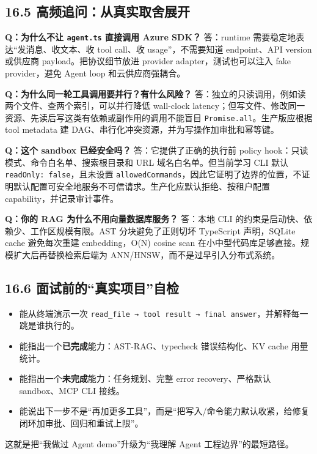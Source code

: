 \subsection{16.5 高频追问：从真实取舍展开}

\textbf{Q：为什么不让 \texttt{agent.ts} 直接调用 Azure SDK？}
答：runtime 需要稳定地表达“发消息、收文本、收 tool call、收 usage”，不需要知道 endpoint、API version 或供应商 payload。把协议细节放进 provider adapter，测试也可以注入 fake provider，避免 Agent loop 和云供应商强耦合。

\textbf{Q：为什么同一轮工具调用要并行？有什么风险？}
答：独立的只读调用，例如读两个文件、查两个索引，可以并行降低 wall-clock latency；但写文件、修改同一资源、先读后写这类有依赖或副作用的调用不能盲目 \texttt{Promise.all}。生产版应根据 tool metadata 建 DAG、串行化冲突资源，并为写操作加审批和幂等键。

\textbf{Q：这个 sandbox 已经安全吗？}
答：它提供了正确的执行前 policy hook：只读模式、命令白名单、搜索根目录和 URL 域名白名单。但当前学习 CLI 默认 \texttt{readOnly: false}，且未设置 \texttt{allowedCommands}，因此它证明了边界的位置，不证明默认配置可安全地服务不可信请求。生产化应默认拒绝、按租户配置 capability，并记录审计事件。

\textbf{Q：你的 RAG 为什么不用向量数据库服务？}
答：本地 CLI 的约束是启动快、依赖少、工作区规模有限。AST 分块避免了正则切坏 TypeScript 声明，SQLite cache 避免每次重建 embedding，O(N) cosine scan 在小中型代码库足够直接。规模扩大后再替换检索后端为 ANN/HNSW，而不是过早引入分布式系统。

\subsection{16.6 面试前的“真实项目”自检}

\begin{itemize}[leftmargin=2em]
\item 能从终端演示一次 \texttt{read\_file → tool result → final answer}，并解释每一跳是谁执行的。
\item 能指出一个\textbf{已完成}能力：AST-RAG、typecheck 错误结构化、KV cache 用量统计。
\item 能指出一个\textbf{未完成}能力：任务规划、完整 error recovery、严格默认 sandbox、MCP CLI 接线。
\item 能说出下一步不是“再加更多工具”，而是“把写入/命令能力默认收紧，给修复闭环加审批、回归和重试上限”。
\end{itemize}

这就是把“我做过 Agent demo”升级为“我理解 Agent 工程边界”的最短路径。


